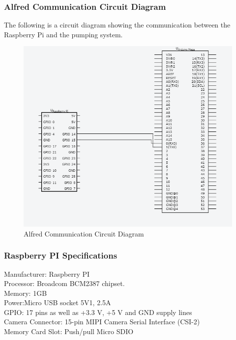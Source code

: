 \documentclass [10pt]{article}
\begin{document}
\subsubsection{Alfred Communication Circuit Diagram}
The following is a circuit diagram showing the communication between the Raspberry Pi and the pumping system.
\begin{figure} [h!]
	\centering
	\includegraphics [scale = 0.4] {Figures/UART.png}
	\caption{Alfred Communication Circuit Diagram}
\end{figure}


\subsubsection{Raspberry PI Specifications}
Manufacturer: Raspberry PI \\
Processor: Broadcom BCM2387 chipset. \\
Memory: 1GB \\
Power:Micro USB socket 5V1, 2.5A\\
GPIO: 17 pins as well as +3.3 V, +5 V and GND supply lines\\
Camera Connector: 15-pin MIPI Camera Serial Interface (CSI-2)\\
Memory Card Slot: Push/pull Micro SDIO\\
\end{document}
